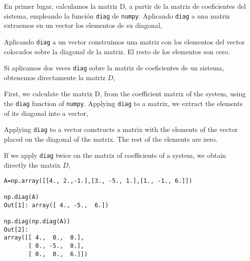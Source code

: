 \begin{paracol}{2}
En primer lugar, calculamos la matriz D, a partir de la matriz de coeficientes del sistema, empleando la función \texttt{diag} de \texttt{numpy}. Aplicando \texttt{diag} a una matriz extraemos en un vector los elementos de su diagonal, 

Aplicando \texttt{diag} a un vector construimos una matriz con los elementos del vector colocados sobre la diagonal de la matriz. El resto de los elementos son cero.

Si aplicamos dos veces \texttt{diag} sobre la matriz de coeficientes de un sistema, obtenemos directamente la matriz $D$,

\switchcolumn
First, we calculate the matrix D, from the coefficient matrix of the system, using the \texttt{diag} function of \texttt{numpy}. Applying \texttt{diag} to a matrix, we extract the elements of its diagonal into a vector, 

Applying \texttt{diag} to a vector constructs a matrix with the elements of the vector placed on the diagonal of the matrix. The rest of the elements are zero.

If we apply \texttt{diag} twice on the matrix of coefficients of a system, we obtain directly the matrix $D$,
\end{paracol}

\begin{verbatim}
A=np.array([[4., 2.,-1.],[3., -5., 1.],[1., -1., 6.]])

np.diag(A)
Out[1]: array([ 4., -5.,  6.])

np.diag(np.diag(A))
Out[2]: 
array([[ 4.,  0.,  0.],
       [ 0., -5.,  0.],
       [ 0.,  0.,  6.]])
\end{verbatim}

